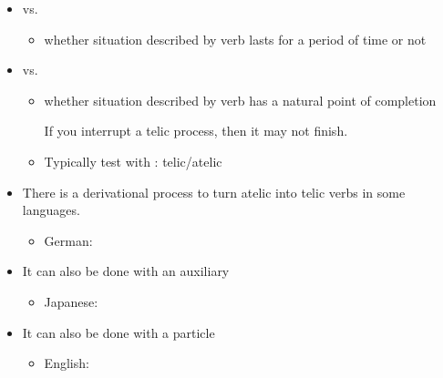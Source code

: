 \documentclass[headrule,footrule]{foils}
\begin{document}

\begin{itemize}
\item {} vs. 
\begin{itemize}
\item  whether situation described by verb lasts for a period of 
  time or not
  \begin{exe}
    \ex {} 
    \ex {}  
  \end{exe}
\end{itemize}
\item  {} vs. 
\begin{itemize}
\item  whether situation described by verb has a natural point of 
  completion
  \begin{exe}
    \ex {}  
    \ex {}  
  \end{exe}
  If you interrupt a telic process, then it may not finish.
  \item Typically test with : telic/atelic
\end{itemize}

\begin{exe}
  \ex {} 
  \ex {} 
\end{exe}
\end{itemize}
\begin{itemize}
\item    There is a derivational process to turn atelic into 
telic verbs in some languages.
\begin{itemize}
\item  German:  \into {}
\end{itemize}
\item  It can also be done with an auxiliary
\begin{itemize}
\item  Japanese:   \into {}
\end{itemize}
\item  It can also be done with a particle
\begin{itemize}
\item  English:   \into {}
\end{itemize}
\end{itemize}
\end{document}

